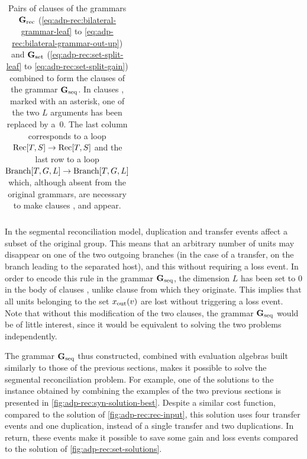 \begin{table}[h]
\begin{tabular}{cccccccccccc}
    \end{tabular}
    \caption[Pairs of clauses of the grammars \(\gramrec\) and \(\gramset\) combined to form \(\gramseq\)]{
        Pairs of clauses of the grammars \(\gramrec\) (\ref{eq:adp-rec:bilateral-grammar-leaf} to \ref{eq:adp-rec:bilateral-grammar-out-up}) and \(\gramset\) (\ref{eq:adp-rec:set-split-leaf} to \ref{eq:adp-rec:set-split-gain}) combined to form the clauses of the grammar \(\gramseq\).
        In clauses , marked with an asterisk, one of the two \(L\) arguments has been replaced by a~0.
        The last column corresponds to a loop \(\mathrm{Rec}[T, S] \rightarrow \mathrm{Rec}[T, S]\) and the last row to a loop \(\mathrm{Branch}[T, G, L] \rightarrow \mathrm{Branch}[T, G, L]\) which, although absent from the original grammars, are necessary to make clauses ,  and  appear.
        \label{tab:adp-rec:product}
    }
\end{table}

In the segmental reconciliation model, duplication and transfer events affect a subset of the original group.
This means that an arbitrary number of units may disappear on one of the two outgoing branches (in the case of a transfer, on the branch leading to the separated host), and this without requiring a loss event.
In order to encode this rule in the grammar \(\gramseq\), the dimension \(L\) has been set to 0 in the body of clauses , unlike clause  from which they originate.
This implies that all units belonging to the set \(x_{\mathrm{out}}(v)\) are lost without triggering a loss event.
Note that without this modification of the two clauses, the grammar \(\gramseq\) would be of little interest, since it would be equivalent to solving the two problems independently.

The grammar \(\gramseq\) thus constructed, combined with evaluation algebras built similarly to those of the previous sections, makes it possible to solve the segmental reconciliation problem.
For example, one of the solutions to the instance obtained by combining the examples of the two previous sections is presented in \cref{fig:adp-rec:syn-solution-best}.
Despite a similar cost function, compared to the solution of \cref{fig:adp-rec:rec-input}, this solution uses four transfer events and one duplication, instead of a single transfer and two duplications.
In return, these events make it possible to save some gain and loss events compared to the solution of \cref{fig:adp-rec:set-solutions}.

